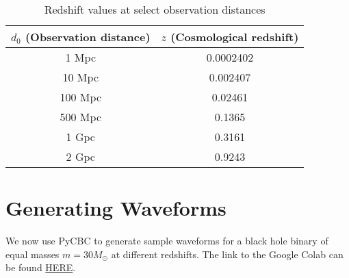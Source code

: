 \documentclass{article}
\begin{document}
\begin{table}[h]
    \centering
    \begin{tabular}{| c | c |}
    \hline
        \textbf{$d_0$ (Observation distance)} & \textbf{$z$ (Cosmological redshift)} \\
        \hline
        1 Mpc& 0.0002402 \\
        10 Mpc & 0.002407 \\
        100 Mpc & 0.02461 \\
        500 Mpc & 0.1365 \\
        1 Gpc & 0.3161 \\
        2 Gpc & 0.9243 \\
        \hline
    \end{tabular}
    \caption{Redshift values at select observation distances}
    \label{redshift_values}
\end{table}


\section{Generating Waveforms}

We now use PyCBC to generate sample waveforms for a black hole binary of equal masses $m = 30 M_\odot$ at different redshifts. The link to the Google Colab can be found \href{https://colab.research.google.com/drive/1MA-n-TfQ8uf4-4IxASPQlvB89WSaL1DS?usp=sharing}{HERE}.
\end{document}
